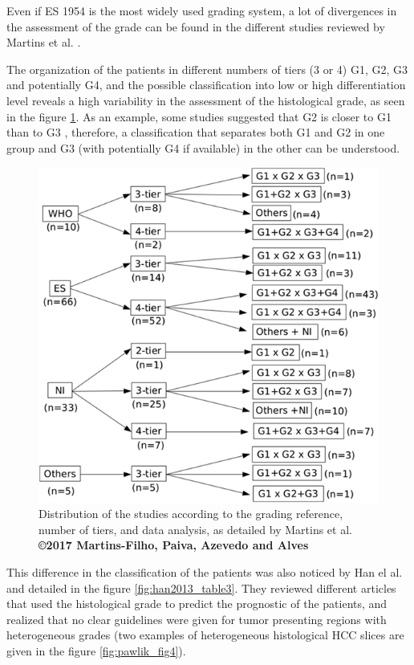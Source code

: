 \documentclass[]{article}
\begin{document}
Even if ES 1954 is the most widely used grading system, a lot of
divergences in the assessment of the grade can be found in the different
studies reviewed by Martins et al. \cite{Martins2017}.

The organization of the patients in different numbers of tiers (3 or 4)
G1, G2, G3 and potentially G4, and the possible classification into low
or high differentiation level reveals a high variability in the
assessment of the histological grade, as seen in the figure \ref{fig:martins2017_figure2}.
As an example, some studies suggested that G2 is closer to G1 than to G3 \cite{Han2013,Zucman-Rossi2015}, therefore, a classification that separates
both G1 and G2 in one group and G3 (with potentially G4 if available) in
the other can be understood.\\


\begin{figure}[th!]
\centering
\includegraphics[width=0.5\linewidth]{images/martins2017_figure2}
\caption{Distribution of the studies according to the grading reference, number of tiers, and data analysis, as detailed by Martins et al. \cite{Martins2017} \textbf{©2017 Martins-Filho, Paiva, Azevedo and Alves}}
\label{fig:martins2017_figure2}
\end{figure}



This difference in the classification of the patients was also noticed
by Han el al. \cite{Han2013} and detailed in the figure \ref{fig:han2013_table3}. They reviewed different articles that used the histological grade to
predict the prognostic of the patients, and realized that no clear
guidelines were given for tumor presenting regions with heterogeneous
grades (two examples of heterogeneous histological HCC slices are given in the figure \ref{fig:pawlik_fig4}).
\end{document}
